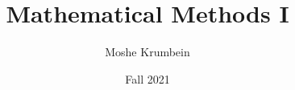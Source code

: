 
\usepackage{subfiles}

\title{Mathematical Methods I}
\def \thecoursenum {80114}
\def \theinstructor {Dr. Moriah Sigron}
\author{Moshe Krumbein}
\date{Fall 2021}





\setcounter{tocdepth}{2}
\tableofcontents
\cleardoublepage
















